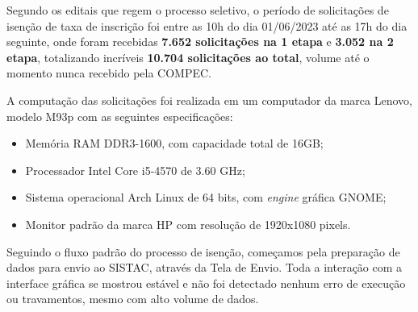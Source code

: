 \documentclass[
	12pt,			%
	openright,		%
	oneside,	
	a4paper,		%
	english,		%
	brazil			%
]{abntex2/abntex2}  %
\begin{document}
		Segundo os editais que regem o processo seletivo, o período de solicitações de isenção de taxa de inscrição foi entre as 10h do dia 01/06/2023 até as 17h do dia seguinte, onde foram recebidas \textbf{7.652 solicitações na 1{\textordfeminine} etapa} e \textbf{3.052 na 2{\textordfeminine} etapa}, totalizando incríveis \textbf{10.704 solicitações ao total}, volume até o momento nunca recebido pela COMPEC.
		
		A computação das solicitações foi realizada em um computador da marca Lenovo, modelo M93p com as seguintes especificações:
		
		\begin{itemize}
			
			\item Memória RAM DDR3-1600, com capacidade total de 16GB;
			\item Processador Intel{\textregistered} Core{\texttrademark} i5-4570 de 3.60 GHz;
			\item Sistema operacional Arch Linux de 64 bits, com \textit{engine} gráfica GNOME;
			\item Monitor padrão da marca HP com resolução de 1920x1080 pixels.
			
		\end{itemize}
		
		Seguindo o fluxo padrão do processo de isenção, começamos pela preparação de dados para envio ao SISTAC, através da Tela de Envio. Toda a interação com a interface gráfica se mostrou estável e não foi detectado nenhum erro de execução ou travamentos, mesmo com alto volume de dados.
		
\end{document}
